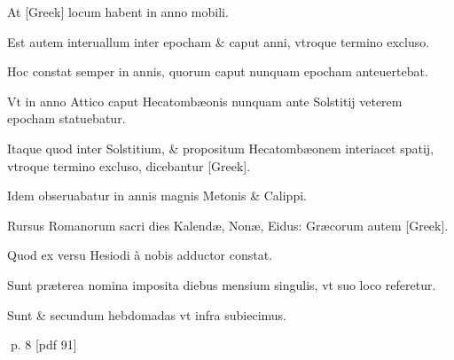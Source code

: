 \begin{parnumbers}
At \textgreek{[Greek]} locum habent in anno mobili.

Est autem interuallum inter epocham \& caput anni, vtroque termino excluso.

Hoc constat semper in annis, quorum caput nunquam epocham anteuertebat.

Vt in anno Attico caput Hecatombæonis nunquam ante Solstitij veterem epocham statuebatur.

Itaque quod inter Solstitium, \& propositum Hecatombæonem interiacet spatij, vtroque termino excluso, dicebantur \textgreek{[Greek]}.

Idem obseruabatur in annis magnis Metonis \& Calippi.

Rursus Romanorum sacri dies Kalendæ, Nonæ, Eidus: Græcorum autem \textgreek{[Greek]}.

Quod ex versu Hesiodi à nobis adductor constat.

Sunt præterea nomina imposita diebus mensium  singulis, vt suo loco referetur.

Sunt \& secundum hebdomadas vt infra subiecimus.
\end{parnumbers}
\clearpage
p. 8 [pdf 91]


